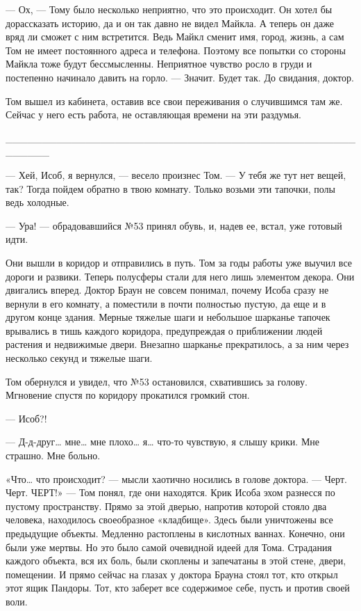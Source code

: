 — Ох, — Тому было несколько неприятно, что это происходит. Он хотел бы дорассказать историю, да и он так давно не видел Майкла. А теперь он даже вряд ли сможет с ним встретится. Ведь Майкл сменит имя, город, жизнь, а сам Том не имеет постоянного адреса и телефона. Поэтому все попытки со стороны Майкла тоже будут бессмысленны. Неприятное чувство росло в груди и постепенно начинало давить на горло. — Значит. Будет так. До свидания, доктор.

Том вышел из кабинета, оставив все свои переживания о случившимся там же. Сейчас у него есть работа, не оставляющая времени на эти раздумья.

______________________________________________________

— Хей, Исоб, я вернулся, — весело произнес Том. — У тебя же тут нет вещей, так? Тогда пойдем обратно в твою комнату. Только возьми эти тапочки, полы ведь холодные.

— Ура! — обрадовавшийся №53 принял обувь, и, надев ее, встал, уже готовый идти.

Они вышли в коридор и отправились в путь. Том за годы работы уже выучил все дороги и развики. Теперь полусферы стали для него лишь элементом декора. Они двигались вперед. Доктор Браун не совсем понимал, почему Исоба сразу не вернули в его комнату, а поместили в почти полностью пустую, да еще и в другом конце здания. Мерные тяжелые шаги и небольшое шарканье тапочек врывались в тишь каждого коридора, предупреждая о приближении людей растения и недвижимые двери. Внезапно шарканье прекратилось, а за ним через несколько секунд и тяжелые шаги.

Том обернулся и увидел, что №53 остановился, схватившись за голову. Мгновение спустя по коридору прокатился громкий стон.

— Исоб?!

— Д-д-друг… мне… мне плохо… я… что-то чувствую, я слышу крики. Мне страшно. Мне больно.

«Что… что происходит? — мысли хаотично носились в голове доктора. — Черт. Черт. ЧЕРТ!» — Том понял, где они находятся. Крик Исоба эхом разнесся по пустому пространству. Прямо за этой дверью, напротив которой стояло два человека, находилось своеобразное «кладбище». Здесь были уничтожены все предыдущие объекты. Медленно растоплены в кислотных ваннах. Конечно, они были уже мертвы. Но это было самой очевидной идеей для Тома. Страдания каждого объекта, вся их боль, были скоплены и запечатаны в этой стене, двери, помещении. И прямо сейчас на глазах у доктора Брауна стоял тот, кто открыл этот ящик Пандоры. Тот, кто заберет все содержимое себе, пусть и против своей воли.

